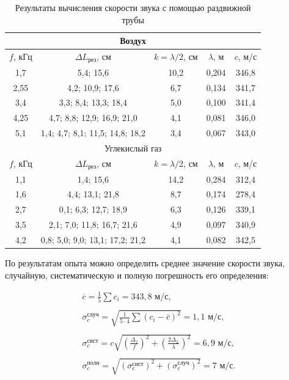 \documentclass[a4paper,12pt]{article} %
\begin{document}
\begin{table}[]
    \centering
    \begin{tabular}{|c|c|c|c|c|}\hline
        \multicolumn{5}{|c|}{Воздух} \\ \hline
        $f$, кГц & $\Delta L_\text{рез}$, см & $k = \lambda/2$, см & $\lambda$, м & $c$, м/с \\ \hline
        1,7 & 5,4; 15,6 & 10,2 & 0,204 & 346,8 \\ \hline
        2,55 & 4,2; 10,9; 17,6 & 6,7 & 0,134 & 341,7 \\ \hline
        3,4 & 3,3; 8,4; 13,3; 18,4 & 5,0 & 0,100 & 341,4 \\ \hline
        4,25 & 4,7; 8,8; 12,9; 16,9; 21,0 & 4,1 & 0,081 & 346,0 \\ \hline
        5,1 & 1,4; 4,7; 8,1; 11,5; 14,8; 18,2 & 3,4 & 0,067 & 343,0 \\ \hline
        \multicolumn{5}{|c|}{Углекислый газ} \\ \hline
        $f$, кГц & $\Delta L_\text{рез}$, см & $k = \lambda/2$, см & $\lambda$, м & $c$, м/с \\ \hline
        1,1 & 1,4; 15,6 & 14,2 & 0,284 & 312,4 \\ \hline
        1,6 & 4,4; 13,1; 21,8 & 8,7 & 0,174 & 278,4 \\ \hline
        2,7 & 0,1; 6,3; 12,7; 18,9 & 6,3 & 0,126 & 339,1 \\ \hline
        3,5 & 2,1; 7,0; 11,8; 16,7; 21,6 & 4,9 & 0,097 & 340,9 \\ \hline
        4,2 & 0,8; 5,0; 9,0; 13,1; 17,2; 21,2 & 4,1 & 0,082 & 342,5 \\ \hline
    \end{tabular}
    \caption{Результаты вычисления скорости звука с помощью раздвижной трубы}
    \label{tab:exp1}
\end{table}

По результатам опыта можно определить среднее значение скорости звука, случайную, систематическую и полную погрешность его определения:

\begin{equation*}
\begin{array}{c}
    \overline{c} = \frac{1}{5}\sum c_i = 343,8 \text{ м/с}, \\
     \\
    \sigma_c^\text{случ} = \sqrt{\frac{1}{5 \cdot 4}\sum (c_i - \overline{c})^2} = 1,1 \text{ м/с}, \\
     \\
    \sigma_c^\text{сист} = c\sqrt{(\frac{\Delta_f}{f})^2 + (\frac{2\Delta_L}{\lambda})^2} = 6,9 \text{ м/с}, \\ 
     \\
    \sigma_c^\text{полн} = \sqrt{(\sigma_c^\text{сист})^2 + (\sigma_c^\text{случ})^2} = 7 \text{ м/с}.
\end{array}
\end{equation*}
\end{document}

